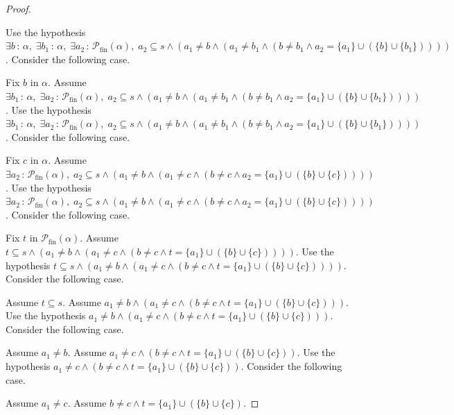 \documentclass{article}
\theoremstyle{paperresult}
\newenvironment{proofstep}{\par\smallskip\ifdim\leftskip<3em\relax\advance\leftskip by 1em\relax\fi\noindent\ignorespaces}{\par\smallskip}
\begin{document}
\begin{proof}
\begin{proofstep}
\begin{proofstep}
Use the hypothesis \(\exists b\, :\, \alpha,\; \exists b_{1}\, :\, \alpha,\; \exists a_{2}\, :\, \mathcal{P}_{\mathrm{fin}}(\alpha),\; a_{2} \subseteq s \land (a_{1} \ne b \land (a_{1} \ne b_{1} \land (b \ne b_{1} \land a_{2} = \{a_{1}\} \cup (\{b\} \cup \{b_{1}\}))))\).
Consider the following case.
\begin{proofstep}
Fix \(b\) in \(\alpha\).
Assume \(\exists b_{1}\, :\, \alpha,\; \exists a_{2}\, :\, \mathcal{P}_{\mathrm{fin}}(\alpha),\; a_{2} \subseteq s \land (a_{1} \ne b \land (a_{1} \ne b_{1} \land (b \ne b_{1} \land a_{2} = \{a_{1}\} \cup (\{b\} \cup \{b_{1}\}))))\).
Use the hypothesis \(\exists b_{1}\, :\, \alpha,\; \exists a_{2}\, :\, \mathcal{P}_{\mathrm{fin}}(\alpha),\; a_{2} \subseteq s \land (a_{1} \ne b \land (a_{1} \ne b_{1} \land (b \ne b_{1} \land a_{2} = \{a_{1}\} \cup (\{b\} \cup \{b_{1}\}))))\).
Consider the following case.
\begin{proofstep}
Fix \(c\) in \(\alpha\).
Assume \(\exists a_{2}\, :\, \mathcal{P}_{\mathrm{fin}}(\alpha),\; a_{2} \subseteq s \land (a_{1} \ne b \land (a_{1} \ne c \land (b \ne c \land a_{2} = \{a_{1}\} \cup (\{b\} \cup \{c\}))))\).
Use the hypothesis \(\exists a_{2}\, :\, \mathcal{P}_{\mathrm{fin}}(\alpha),\; a_{2} \subseteq s \land (a_{1} \ne b \land (a_{1} \ne c \land (b \ne c \land a_{2} = \{a_{1}\} \cup (\{b\} \cup \{c\}))))\).
Consider the following case.
\begin{proofstep}
Fix \(t\) in \(\mathcal{P}_{\mathrm{fin}}(\alpha)\).
Assume \(t \subseteq s \land (a_{1} \ne b \land (a_{1} \ne c \land (b \ne c \land t = \{a_{1}\} \cup (\{b\} \cup \{c\}))))\).
Use the hypothesis \(t \subseteq s \land (a_{1} \ne b \land (a_{1} \ne c \land (b \ne c \land t = \{a_{1}\} \cup (\{b\} \cup \{c\}))))\).
Consider the following case.
\begin{proofstep}
Assume \(t \subseteq s\).
Assume \(a_{1} \ne b \land (a_{1} \ne c \land (b \ne c \land t = \{a_{1}\} \cup (\{b\} \cup \{c\})))\).
Use the hypothesis \(a_{1} \ne b \land (a_{1} \ne c \land (b \ne c \land t = \{a_{1}\} \cup (\{b\} \cup \{c\})))\).
Consider the following case.
\begin{proofstep}
Assume \(a_{1} \ne b\).
Assume \(a_{1} \ne c \land \left(b \ne c \land t = \{a_{1}\} \cup \left(\{b\} \cup \{c\}\right)\right)\).
Use the hypothesis \(a_{1} \ne c \land \left(b \ne c \land t = \{a_{1}\} \cup \left(\{b\} \cup \{c\}\right)\right)\).
Consider the following case.
\begin{proofstep}
Assume \(a_{1} \ne c\).
Assume \(b \ne c \land t = \{a_{1}\} \cup \left(\{b\} \cup \{c\}\right)\).

\end{proofstep}
\end{proofstep}
\end{proofstep}
\end{proofstep}
\end{proofstep}
\end{proofstep}
\end{proofstep}
\end{proofstep}
\end{proof}
\end{document}
